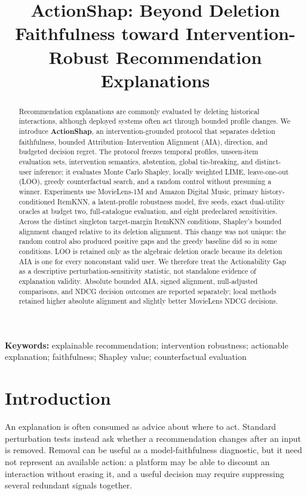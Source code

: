 \documentclass[pdflatex,sn-basic]{sn-jnl}
\title[ActionShap]{ActionShap: Beyond Deletion Faithfulness toward Intervention-Robust Recommendation Explanations}
\author*[1]{\fnm{Mouad} \sur{Louhichi}}
\author[1]{\fnm{Redwane} \sur{Nesmaoui}}
\author[1]{\fnm{Mohamed} \sur{Lazaar}}
\affil[1]{\orgname{Independent research}, \country{Tunisia}}
\begin{document}
\maketitle

\begin{abstract}
Recommendation explanations are commonly evaluated by deleting historical interactions, although deployed systems often act through bounded profile changes. We introduce \textbf{ActionShap}, an intervention-grounded protocol that separates deletion faithfulness, bounded Attribution--Intervention Alignment (AIA), direction, and budgeted decision regret. The protocol freezes temporal profiles, unseen-item evaluation sets, intervention semantics, abstention, global tie-breaking, and distinct-user inference; it evaluates Monte Carlo Shapley, locally weighted LIME, leave-one-out (LOO), greedy counterfactual search, and a random control without presuming a winner. Experiments use MovieLens-1M and Amazon Digital Music, primary history-conditioned ItemKNN, a latent-profile robustness model, five seeds, exact dual-utility oracles at budget two, full-catalogue evaluation, and eight predeclared sensitivities. Across the distinct singleton target-margin ItemKNN conditions, Shapley's bounded alignment changed relative to its deletion alignment. This change was not unique: the random control also produced positive gaps and the greedy baseline did so in some conditions. LOO is retained only as the algebraic deletion oracle because its deletion AIA is one for every nonconstant valid user. We therefore treat the Actionability Gap as a descriptive perturbation-sensitivity statistic, not standalone evidence of explanation validity. Absolute bounded AIA, signed alignment, null-adjusted comparisons, and NDCG decision outcomes are reported separately; local methods retained higher absolute alignment and slightly better MovieLens NDCG decisions.
\end{abstract}

\textbf{Keywords:} explainable recommendation; intervention robustness; actionable explanation; faithfulness; Shapley value; counterfactual evaluation

\section{Introduction}
An explanation is often consumed as advice about where to act. Standard perturbation tests instead ask whether a recommendation changes after an input is removed. Removal can be useful as a model-faithfulness diagnostic, but it need not represent an available action: a platform may be able to discount an interaction without erasing it, and a useful decision may require suppressing several redundant signals together.
\end{document}
